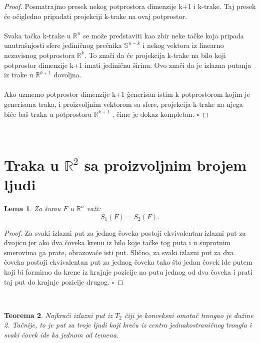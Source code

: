 \documentclass[11pt,letter]{article}
\newtheorem{teo}{\bf Teorema}[section]
\newtheorem{lem}[teo]{\bf Lema}
\begin{document}
\begin{proof}
Posmatrajmo presek nekog potprostora dimenzije k+1 i k-trake. Taj presek \' ce o\v cigledno pripadati projekciji k-trake na ovaj potprostor.
\\
\\
\indent  Svaka ta\v cka k-trake u $\mathbb{R}^n$ se mo\v ze predstaviti kao zbir neke ta\v cke koja pripada unutra\v snjosti sfere jedini\v cnog pre\v cnika $\mathbb{S}^{n-k}$ i nekog vektora iz linearno nezavisnog potprostora $\mathbb{R}^k$. To zna\v ci da \' ce projekcija k-trake na bilo koji potprostor dimenzije k+1 imati jedini\v cnu \v sirinu. Ovo zna\v ci da je izlazna putanja iz trake u  $\mathbb{R}^{k+1}$ dovoljna. 
\\
\\
\indent Ako uzmemo potprostor dimenzije k+1 \v generisan istim k potprostorom kojim je generisana traka, i proizvoljnim vektorom sa sfere, projekcija k-trake na njega bi\' ce ba\v s traka u potprostoru $\mathbb{R}^{k+1}$ , \v cime je dokaz kompletan.
$\square$
\end{proof}
\\

\section[Traka u $\mathbb{R}^2$ sa proizvoljnim brojem ljudi]{Traka u $\mathbb{R}^2$ sa proizvoljnim brojem ljudi}

\begin{lem} Za \v sumu $F$ u $\mathbb{R}^n$ va\v zi: $$S_1(F)=S_2(F).$$\end{lem}
\begin{proof}
Za svaki izlazni put za jednog \v coveka postoji ekvivalentan izlazni put za dvojicu jer ako dva \v coveka krenu iz bilo koje ta\v cke tog puta i u suprotnim smerovima ga prate, obrazova\' ce isti put. Sli\v cno, za svaki izlazni put za dva \v coveka postoji ekvivalentan put za jednog \v coveka tako \v sto jedan \v covek ide putem koji bi formirao da krene iz krajnje pozicije na putu jednog od dva \v coveka i prati taj put do krajnje pozicije drugog.
$\square$
\end{proof}
\\
\begin{teo} Najkra\' ci izlazni put iz $T_2$ \v ciji je konveksni omota\v c trougao je du\v zine 2. Ta\v cnije, to je put za troje ljudi koji kre\' cu iz centra jednakostrani\v cnog trougla i svaki \v covek ide ka jednom od temena.
\end{teo}
\end{document}
